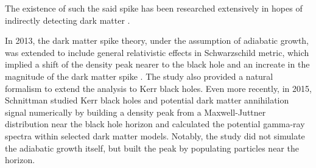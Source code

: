 \documentclass[12pt]{article}
\begin{document}

The existence of such the said spike has been researched extensively in hopes of 
indirectly detecting dark matter \citep{gondolo2000dmsearch,bertone2001dmsearch,fields2014galactic}. %



% 



In 2013, the dark matter spike theory, under the assumption of adiabatic growth, 
was extended to include general relativistic effects in Schwarzschild metric, 
which implied a shift of the density peak nearer to the black hole  
and an increate in the magnitude of the dark matter spike 
\citep{Sadeghian_Ferrer_Will_2013}. The study
also provided a natural formalism to extend the analysis to 
Kerr black holes. Even more recently, in 2015, Schnittman 
studied Kerr black holes and potential dark matter annihilation signal 
numerically by building a density peak from a Maxwell-Juttner 
distribution near the black hole horizon and calculated 
the potential gamma-ray spectra within selected 
dark matter models. 
Notably, the study did not simulate the adiabatic 
growth itself, but built the peak by populating particles 
near the horizon.
\end{document}

